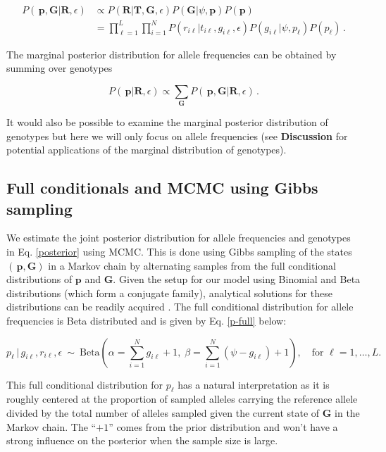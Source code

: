 \documentclass[11pt,english,letterpaper,oneside]{article}
\begin{document}
\begin{align}\label{posterior}
P(\,\bm{p},\bm{G}|\bm{R},\epsilon) &\propto P(\bm{R}|\bm{T},\bm{G}, \epsilon)P(\bm{G}|\psi,\bm{p})P(\bm{p}) \nonumber \\[0.05in]
&= \displaystyle\prod_{\ell=1}^L\displaystyle\prod_{i=1}^N P(r_{i \ell}|t_{i\ell}, g_{i \ell},\epsilon)P(g_{i \ell}|\psi, p_{\ell})P(p_{\ell})\,.
\end{align}

\noindent The marginal posterior distribution for allele frequencies can be obtained by summing over genotypes

\begin{equation}\label{marg_post_p}
P(\,\bm{p}|\bm{R},\epsilon) \propto \displaystyle\sum_{\bm{G}} P(\,\bm{p},\bm{G}|\bm{R},\epsilon)\,.
\end{equation}

\noindent It would also be possible to examine the marginal posterior distribution of genotypes but here we will only focus on allele frequencies (see \textbf{Discussion} for potential applications of the marginal distribution of genotypes).

\medskip
\subsection*{Full conditionals and MCMC using Gibbs sampling}
\medskip

\noindent We estimate the joint posterior distribution for allele frequencies and genotypes in Eq. \ref{posterior} using MCMC. This is done using Gibbs sampling of the states $(\,\bm{p},\bm{G})$ in a Markov chain by alternating samples from the full conditional distributions of $\bm{p}$ and $\bm{G}$. Given the setup for our model using Binomial and Beta distributions (which form a conjugate family), analytical solutions for these distributions can be readily acquired \citep{gelman2014bayesian}. The full conditional distribution for allele frequencies is Beta distributed and is given by Eq. \ref{p-full} below:

\begin{equation}\label{p-full}
p_{\ell}\,|\,g_{i \ell},r_{i \ell},\epsilon \: \sim \: \text{Beta}\left(\alpha= \sum_{i=1}^N g_{i \ell} +1,\; \beta = \sum_{i=1}^N (\psi-g_{i \ell})+1\right),\quad \text{for } \ell = 1,\ldots,L.
\end{equation}

\noindent This full conditional distribution for $p_{\ell}$ has a natural interpretation as it is roughly centered at the proportion of sampled alleles carrying the reference allele divided by the total number of alleles sampled given the current state of $\bm{G}$ in the Markov chain. The ``$+1$'' comes from the prior distribution and won't have a strong influence on the posterior when the sample size is large.
\medskip
\end{document}
